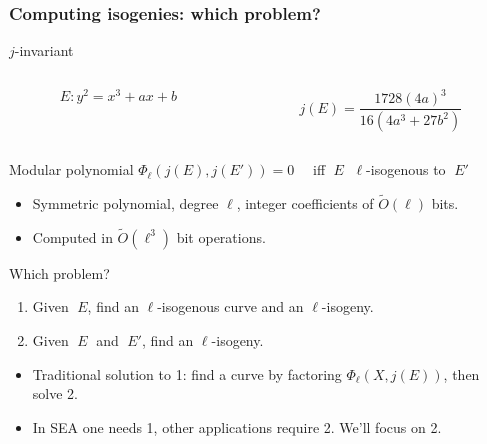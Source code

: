 \documentclass[10pt]{beamer}
\newcommand{\0}{\mathcal{O}}  %
\newcommand{\tildO}{\tilde{O}}  %
\begin{document}
\begin{frame}
  \frametitle{Computing isogenies: which problem?}

  \begin{block}{$j$-invariant}
    \begin{columns}
      \begin{column}{0.5\textwidth}
        \[E : y^2 = x^3 + ax + b\]
      \end{column}
      \begin{column}{0.5\textwidth}
        \[j(E) = \frac{1728(4a)^3}{16(4a^3 + 27b^2)}\]
      \end{column}
    \end{columns}
  \end{block}
  
  \begin{block}{Modular polynomial}
    \centering
    $\Phi_\ell(j(E),j(E')) = 0\quad$ iff $\;E\;$ $\ell$-isogenous to $\;E'\;$

    \begin{itemize}
    \item Symmetric polynomial, degree $\ell$, integer coefficients of
      $\tildO(\ell)$ bits.
    \item Computed in $\tildO(\ell^3)$ bit operations.
    \end{itemize}
  \end{block}

  \begin{block}{Which problem?}
    \begin{enumerate}
    \item Given $\;E$, find an $\ell$-isogenous curve and an $\ell$-isogeny.
    \item Given $\;E\;$ and $\;E'$, find an $\ell$-isogeny.
    \end{enumerate}
    \begin{itemize}
    \item Traditional solution to 1: find a curve by factoring
      $\Phi_\ell(X,j(E))$, then solve 2.
    \item In SEA one needs 1, other applications require 2. We'll
      focus on 2.
    \end{itemize}
  \end{block}
\end{frame}

\end{document}
